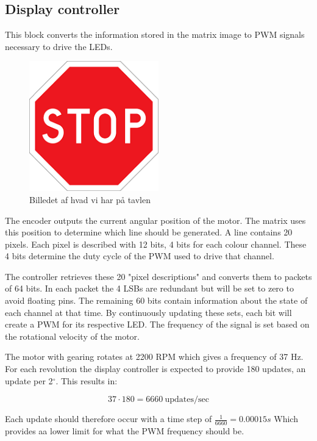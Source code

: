 \subsection{Display controller}
This block converts the information stored in the matrix image to PWM signals necessary to drive the LEDs.

\begin{figure}[H]
	\center
	\includegraphics[width = 0.5\textwidth]{images/stop}
	\caption{Billedet af hvad vi har på tavlen}
	\label{fig:Image_controller_setup}
\end{figure}

The encoder outputs the current angular position of the motor.
The matrix uses this position to determine which line should be generated.
A line contains 20 pixels.
Each pixel is described with 12 bits, 4 bits for each colour channel.
These 4 bits determine the duty cycle of the PWM used to drive that channel.

The controller retrieves these 20 "pixel descriptions" and converts them to packets of 64 bits.
In each packet the 4 LSBs are redundant but will be set to zero to avoid floating pins.
The remaining 60 bits contain information about the state of each channel at that time.
By continuously updating these sets, each bit will create a PWM for its respective LED.
The frequency of the signal is set based on the rotational velocity of the motor.

The motor with gearing rotates at 2200 RPM which gives a frequency of 37 Hz.	
For each revolution the display controller is expected to provide 180 updates, an update per 2$^\circ$.
This results in:

$$37 \cdot 180 = 6660 ~\text{updates/sec}$$

Each update should therefore occur with a time step of $\frac{1}{6660} = 0.00015s$ Which provides aa lower limit for what the PWM frequency should be.  \\

